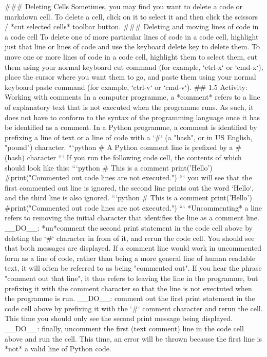 \documentclass[letterpaper,10pt,english]{sphinxmanual}
\begin{document}
{### Deleting Cells
Sometimes, you may find you want to delete a code or markdown cell.
To delete a cell, click on it to select it and then click the scissors / *cut selected cells* toolbar button.
### Deleting and moving lines of code in a code cell
To delete one of more particular lines of code in a code cell, highlight just that line or lines of code and use the keyboard delete key to delete them.
To move one or more lines of code in a code cell, highlight them to select them, cut them using your normal keyboard cut command (for example, `ctrl-x` or `cmd-x`), place the cursor where you want them to go, and paste them using your normal keyboard paste command (for example, `ctrl-v` or `cmd-v`).
## 1.5 Activity: Working with comments
In a computer programme, a *comment* refers to a line of explanatory text that is not executed when the programme runs. As such, it does not have to conform to the syntax of the programming language once it has be identified as a comment.
In a Python programme, a comment is identified by prefixing a line of text or a line of code with a `#` (a "hash", or in US English, "pound") character.
```python
# A Python comment line is prefixed by a # (hash) character
```
If you run the following code cell, the contents of which should look like this:
```python
# This is a comment
print('Hello')
#print("Commented out code lines are not executed.")
```
you will see that the first commented out line is ignored, the second line prints out the word `Hello`, and the third line is also ignored.
```python
# This is a comment
print('Hello')
#print("Commented out code lines are not executed.")
```
*Uncommenting* a line refers to removing the initial character that identifies the line as a comment line.
__DO__: *un*comment the second print statement in the code cell above by deleting the `#` character in from of it, and rerun the code cell. You should see that both messages are displayed.
If a comment line would work in uncommented form as a line of code, rather than being a more general line of human readable text, it will often be referred to as being "commented out".
If you hear the phrase "comment out that line", it thus refers to leaving the line in the programme, but prefixing it with the comment character so that the line is not exectuted when the programme is run.
__DO__: comment out the first print statement in the code cell above by prefixing it with the `#` comment character and rerun the cell. This time you should only see the second print message being displayed.
__DO__: finally, uncomment the first (text comment) line in the code cell above and run the cell. This time, an error will be thrown because the first line is *not* a valid line of Python code.
}
\end{document}
